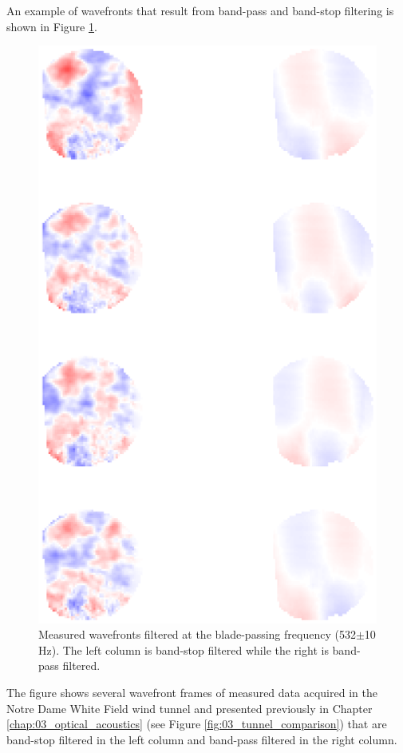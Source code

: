 An example of wavefronts that result from band-pass and band-stop filtering is shown in Figure \ref{fig:06_filter_temporal_bandpass}.
\begin{figure}
 \centering
 \includegraphics{../matlab/06_single_sensor_filtering/filter_temporal_bandpass.eps}
 \caption{Measured wavefronts filtered at the blade-passing frequency (532$\pm$10 Hz).  The left column is band-stop filtered while the right is band-pass filtered.}
 \label{fig:06_filter_temporal_bandpass}
\end{figure}
The figure shows several wavefront frames of measured data acquired in the Notre Dame White Field wind tunnel and presented previously in Chapter \ref{chap:03_optical_acoustics} (see Figure \ref{fig:03_tunnel_comparison}) that are band-stop filtered in the left column and band-pass filtered in the right column.
